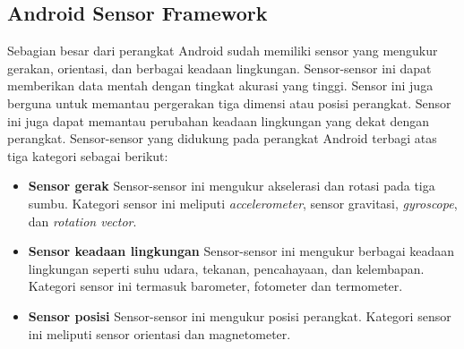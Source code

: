 \subsection{Android Sensor Framework}
\label{sec:android_sensor_framework}
Sebagian besar dari perangkat Android sudah memiliki sensor yang mengukur gerakan, orientasi, dan berbagai keadaan lingkungan. Sensor-sensor ini dapat memberikan data mentah dengan tingkat akurasi yang tinggi. Sensor ini juga berguna untuk memantau pergerakan tiga dimensi atau posisi perangkat. Sensor ini juga dapat memantau perubahan keadaan lingkungan yang dekat dengan perangkat. 
Sensor-sensor yang didukung pada perangkat Android terbagi atas tiga kategori sebagai berikut:
\begin{itemize}
	\item \textbf{Sensor gerak}
	Sensor-sensor ini mengukur akselerasi dan rotasi pada tiga sumbu. Kategori sensor ini meliputi \textit{accelerometer}, sensor gravitasi, \textit{gyroscope}, dan \textit{rotation vector}. 
	\item \textbf{Sensor keadaan lingkungan}
	Sensor-sensor ini mengukur berbagai keadaan lingkungan seperti suhu udara, tekanan, pencahayaan, dan kelembapan. Kategori sensor ini termasuk barometer, fotometer dan termometer.
	\item \textbf{Sensor posisi}
	Sensor-sensor ini mengukur posisi perangkat. Kategori sensor ini meliputi sensor orientasi dan magnetometer.
\end{itemize}

